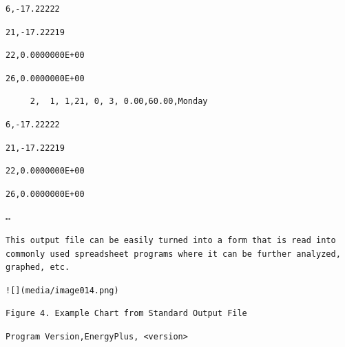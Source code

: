 \begin{lstlisting}
6,-17.22222
\end{lstlisting}

\begin{lstlisting}
21,-17.22219
\end{lstlisting}

\begin{lstlisting}
22,0.0000000E+00
\end{lstlisting}

\begin{lstlisting}
26,0.0000000E+00
\end{lstlisting}

\begin{lstlisting}
     2,  1, 1,21, 0, 3, 0.00,60.00,Monday
\end{lstlisting}

\begin{lstlisting}
6,-17.22222
\end{lstlisting}

\begin{lstlisting}
21,-17.22219
\end{lstlisting}

\begin{lstlisting}
22,0.0000000E+00
\end{lstlisting}

\begin{lstlisting}
26,0.0000000E+00
\end{lstlisting}

\begin{lstlisting}
…
\end{lstlisting}

\begin{lstlisting}
This output file can be easily turned into a form that is read into commonly used spreadsheet programs where it can be further analyzed, graphed, etc.
\end{lstlisting}

\begin{lstlisting}
![](media/image014.png)
\end{lstlisting}

\begin{lstlisting}
Figure 4. Example Chart from Standard Output File
\end{lstlisting}

\begin{lstlisting}
Program Version,EnergyPlus, <version>
\end{lstlisting}

